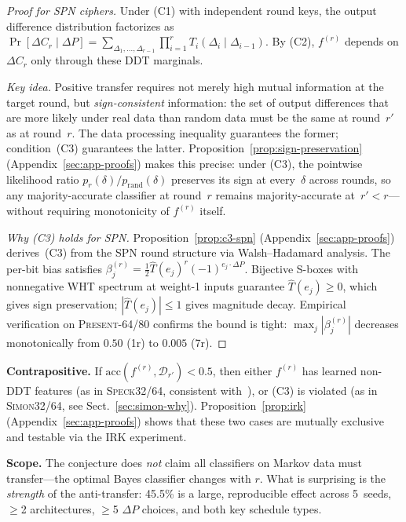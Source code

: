 \documentclass[runningheads]{llncs}
\newcommand{\speck}{\textsc{Speck32/64}\xspace}
\newcommand{\simon}{\textsc{Simon32/64}\xspace}
\newcommand{\present}{\textsc{Present-64/80}\xspace}
\begin{document}
\begin{proof}[Proof for SPN ciphers]
Under (C1) with independent round keys, the output difference distribution factorizes as
$\Pr[\Delta C_r \mid \Delta P] = \sum_{\Delta_1, \ldots, \Delta_{r-1}}
\prod_{i=1}^{r} T_i(\Delta_i \mid \Delta_{i-1})$.
By (C2), $f^{(r)}$ depends on $\Delta C_r$ only through these DDT marginals.

\emph{Key idea.}
Positive transfer requires not merely high mutual information at the target round, but \emph{sign-consistent} information: the set of output differences that are more likely under real data than random data must be the same at round~$r'$ as at round~$r$.
The data processing inequality guarantees the former; condition~(C3) guarantees the latter.
Proposition~\ref{prop:sign-preservation} (Appendix~\ref{sec:app-proofs}) makes this precise: under (C3), the pointwise likelihood ratio $p_r(\delta)/p_{\mathrm{rand}}(\delta)$ preserves its sign at every~$\delta$ across rounds, so any majority-accurate classifier at round~$r$ remains majority-accurate at~$r' < r$---without requiring monotonicity of $f^{(r)}$ itself.

\emph{Why (C3) holds for SPN.}
Proposition~\ref{prop:c3-spn} (Appendix~\ref{sec:app-proofs}) derives~(C3) from the SPN round structure via Walsh--Hadamard analysis.
The per-bit bias satisfies $\beta_j^{(r)} = \tfrac{1}{2}\hat{T}(e_j)^r(-1)^{e_j \cdot \Delta P}$.
Bijective S-boxes with nonnegative WHT spectrum at weight-1 inputs guarantee $\hat{T}(e_j) \geq 0$, which gives sign preservation; $|\hat{T}(e_j)| \leq 1$ gives magnitude decay.
Empirical verification on \present confirms the bound is tight: $\max_j |\beta_j^{(r)}|$ decreases monotonically from $0.50$ (1r) to $0.005$ (7r).
\end{proof}

\textbf{Contrapositive.}
If $\mathrm{acc}(f^{(r)}, \mathcal{D}_{r'}) < 0.5$, then either $f^{(r)}$ has learned non-DDT features (as in \speck, consistent with~\cite{gohr2022assessment}), or (C3) is violated (as in \simon, see Sect.~\ref{sec:simon-why}).
Proposition~\ref{prop:irk} (Appendix~\ref{sec:app-proofs}) shows that these two cases are mutually exclusive and testable via the IRK experiment.

\textbf{Scope.}
The conjecture does \emph{not} claim all classifiers on Markov data must transfer---the optimal Bayes classifier changes with $r$.
What is surprising is the \emph{strength} of the anti-transfer: 45.5\% is a large, reproducible effect across 5~seeds, $\geq$2 architectures, $\geq$5 $\Delta P$ choices, and both key schedule types.
\end{document}
